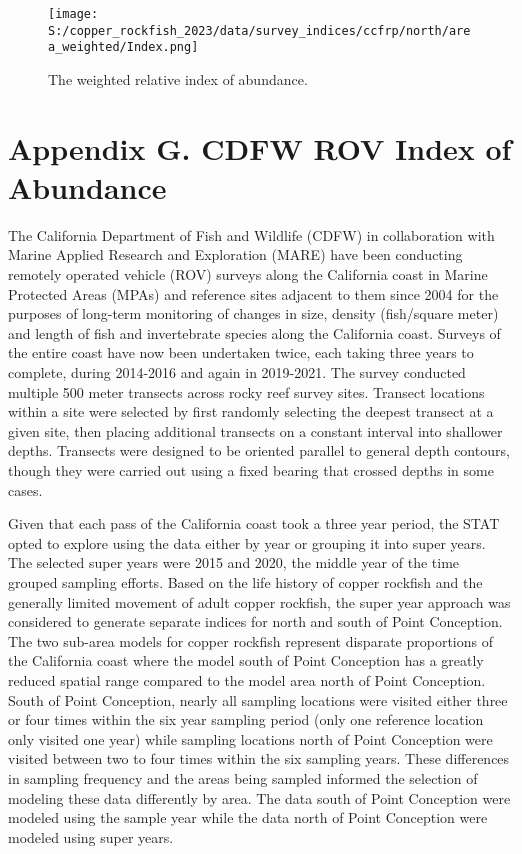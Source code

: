 \documentclass[11pt,
  english,
  letterpaper,
]{article}
\begin{document}
\newpage

\begin{figure}
\centering
\texttt{[image: S:/copper\_rockfish\_2023/data/survey\_indices/ccfrp/north/area\_weighted/Index.png]}
\caption{The weighted relative index of abundance.\label{fig:ccfrp-index}}
\end{figure}

\hypertarget{cdfw-rov-index}{%
\section{Appendix G. CDFW ROV Index of Abundance}\label{cdfw-rov-index}}

The California Department of Fish and Wildlife (CDFW) in collaboration with Marine Applied Research and Exploration (MARE) have been conducting remotely operated vehicle (ROV) surveys along the California coast in Marine Protected Areas (MPAs) and reference sites adjacent to them since 2004 for the purposes of long-term monitoring of changes in size, density (fish/square meter) and length of fish and invertebrate species along the California coast. Surveys of the entire coast have now been undertaken twice, each taking three years to complete, during 2014-2016 and again in 2019-2021. The survey conducted multiple 500 meter transects across rocky reef survey sites. Transect locations within a site were selected by first randomly selecting the deepest transect at a given site, then placing additional transects on a constant interval into shallower depths. Transects were designed to be oriented parallel to general depth contours, though they were carried out using a fixed bearing that crossed depths in some cases.

Given that each pass of the California coast took a three year period, the STAT opted to explore using the data either by year or grouping it into super years. The selected super years were 2015 and 2020, the middle year of the time grouped sampling efforts. Based on the life history of copper rockfish and the generally limited movement of adult copper rockfish, the super year approach was considered to generate separate indices for north and south of Point Conception. The two sub-area models for copper rockfish represent disparate proportions of the California coast where the model south of Point Conception has a greatly reduced spatial range compared to the model area north of Point Conception. South of Point Conception, nearly all sampling locations were visited either three or four times within the six year sampling period (only one reference location only visited one year) while sampling locations north of Point Conception were visited between two to four times within the six sampling years. These differences in sampling frequency and the areas being sampled informed the selection of modeling these data differently by area. The data south of Point Conception were modeled using the sample year while the data north of Point Conception were modeled using super years.
\end{document}
